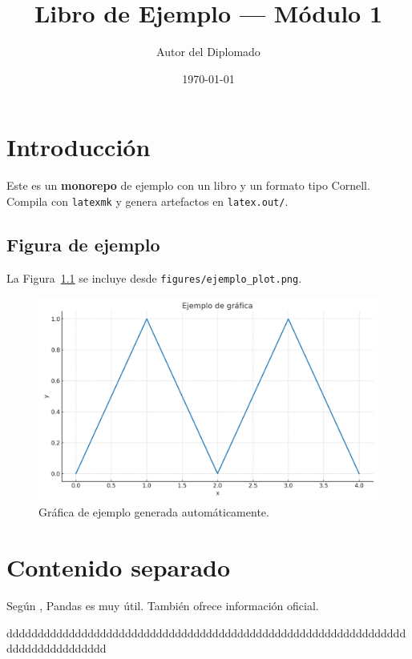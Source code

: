 \documentclass[12pt]{book}
\title{Libro de Ejemplo — Módulo 1}
\author{Autor del Diplomado}
\date{\today}
\begin{document}
\frontmatter
\maketitle

\tableofcontents

\mainmatter

\chapter{Introducción}
Este es un \textbf{monorepo} de ejemplo con un libro y un formato tipo Cornell.
Compila con \texttt{latexmk} y genera artefactos en \texttt{latex.out/}.

\section{Figura de ejemplo}
La Figura~\ref{fig:plot} se incluye desde \texttt{figures/ejemplo\_plot.png}.

\begin{figure}[h]
    \centering
    \includegraphics[width=0.7\linewidth]{ejemplo_plot.png}
    \caption{Gráfica de ejemplo generada automáticamente.}
    \label{fig:plot}
\end{figure}

\chapter{Contenido separado}






Según \textcite{mckinney2010}, Pandas es muy útil.
También \parencite{python_docs} ofrece información oficial.

\begin{definition}
dddddddddddddddddddddddddddddddddddddddddddddddddddddddddddddddddddddddddddddddd
\end{definition}

\printbibliography


\backmatter
\end{document}
